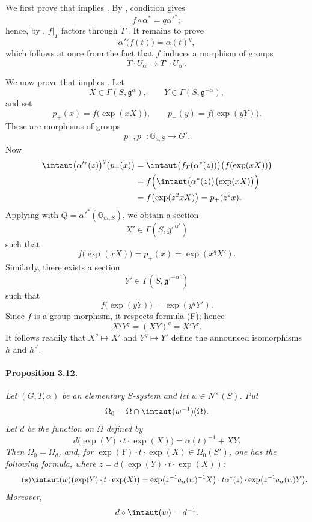 \smallskip
We first prove that \textup{} implies \textup{}.  By ,
condition \textup{} gives
\[
  f\circ\alpha^\ast=q\alpha'^\ast;
\]
hence, by , \(f|_T\) factors through \(T'\).  It remains to prove
\[
  \alpha'\bigl(f(t)\bigr)=\alpha(t)^q,
\]
which follows at once from the fact that \(f\) induces a morphism of
groups
\[
  T\cdot U_\alpha\longrightarrow T'\cdot U_{\alpha'}.
\]

We now prove that \textup{} implies \textup{}.  Let
\[
  X\in\Gamma(S,\mathfrak g^\alpha),
  \qquad
  Y\in\Gamma(S,\mathfrak g^{-\alpha}),
\]
and set
\[
  p_+(x)=f\bigl(\exp(xX)\bigr),
  \qquad
  p_-(y)=f\bigl(\exp(yY)\bigr).
\]
These are morphisms of groups
\[
  p_+,p_-\colon\mathbb G_{a,S}\longrightarrow G'.
\]
Now
\[
\begin{aligned}
  \intaut\bigl(\alpha'^\ast(z)\bigr)^q\bigl(p_+(x)\bigr)
    &={}\intaut\bigl(f_T(\alpha^\ast(z))\bigr)
       \bigl(f(\exp(xX))\bigr)\\
    &={}f\Bigl(\intaut\bigl(\alpha^\ast(z)\bigr)
       \bigl(\exp(xX)\bigr)\Bigr)\\
    &={}f\bigl(\exp(z^2xX)\bigr)
     =p_+(z^2x).
\end{aligned}
\]
Applying  with
\(Q=\alpha'^\ast(\mathbb G_{m,S})\), we obtain a section
\[
  X'\in\Gamma(S,\mathfrak g'^{\,\alpha'})
\]
such that
\[
  f\bigl(\exp(xX)\bigr)=p_+(x)=\exp(x^qX').
\]
Similarly, there exists a section
\[
  Y'\in\Gamma(S,\mathfrak g'^{-\alpha'})
\]
such that
\[
  f\bigl(\exp(yY)\bigr)=\exp(y^qY').
\]
Since \(f\) is a group morphism, it respects formula \textup{(F)};
hence
\[
  X^qY^q=(XY)^q=X'Y'.
\]
It follows readily that \(X^q\mapsto X'\) and \(Y^q\mapsto Y'\)
define the announced isomorphisms \(h\) and \(h^\vee\).


\paragraph{\textbf{Proposition 3.12.}}
\emph{Let \((G,T,\alpha)\) be an elementary \(S\)-system and let
\(w\in N^\times(S)\).  Put}
\[
  \Omega_0=\Omega\cap\intaut(w^{-1})(\Omega).
\]
\emph{Let \(d\) be the function on \(\Omega\) defined by}
\[
  d\bigl(\exp(Y)\cdot t\cdot\exp(X)\bigr)
    =\alpha(t)^{-1}+XY.
\]
\emph{Then \(\Omega_0=\Omega_d\), and, for
\(\exp(Y)\cdot t\cdot\exp(X)\in\Omega_0(S')\), one has the following
formula, where
\(z=d(\exp(Y)\cdot t\cdot\exp(X))\):}
\begin{equation}
\tag{\(\star\)}\label{sga3:xx:proposition:3-12:equation:star}
  \intaut(w)\bigl(\exp(Y)\cdot t\cdot\exp(X)\bigr)
  =
  \exp\bigl(z^{-1}a_\alpha(w)^{-1}X\bigr)\cdot
  t\alpha^\ast(z)\cdot
  \exp\bigl(z^{-1}a_\alpha(w)Y\bigr).
\end{equation}
\emph{Moreover,}
\[
  d\circ\intaut(w)=d^{-1}.
\]

